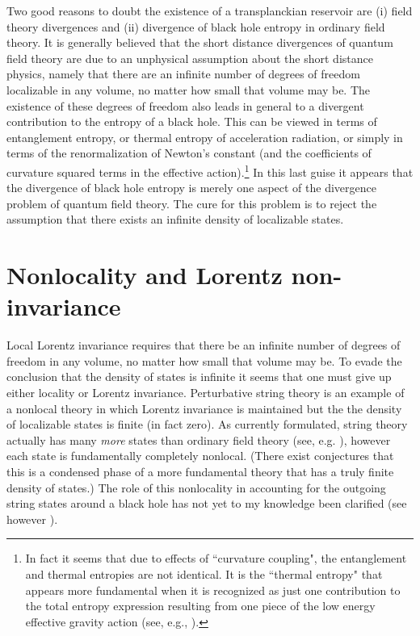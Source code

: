 Two good reasons to doubt the existence of a transplanckian reservoir
are (i) field theory divergences and (ii) divergence of black hole
entropy in ordinary field theory.  It is generally believed that the
short distance divergences of quantum field theory are due to an
unphysical assumption about the short distance physics, namely that
there are  an infinite number of degrees of freedom localizable in any
volume, no matter how small that volume may be.  The existence of these
degrees of freedom also leads in general to a divergent contribution to
the entropy of a black hole. This can be viewed in terms of
entanglement entropy\cite{Sork,Bombetal,FrolNovi}, or thermal entropy
of acceleration radiation\cite{tHooft}, or simply in terms of the
renormalization of Newton's constant (and the coefficients of curvature
squared terms in the effective
action)\cite{SussUglu,Jacoindu}.\footnote{In fact it seems that due to
effects of ``curvature coupling", the entanglement and thermal
entropies are not identical. It is the ``thermal entropy" that appears
more fundamental when it is recognized as just one contribution to the
total entropy expression resulting from one piece of the low energy
effective gravity action (see, e.g., \cite{Frol-rev}).} In this last
guise it appears that the divergence of black hole entropy is merely
one aspect of the divergence problem of quantum field theory.  The cure
for this problem is to reject the assumption that there exists an
infinite density of localizable states.


\section{Nonlocality and Lorentz non-invariance}

Local Lorentz invariance requires that there be an infinite number of
degrees of freedom in any volume, no matter how small that volume may
be. To evade the conclusion that the density of states is infinite it
seems that one must give up either locality or Lorentz invariance.
Perturbative string theory is an example of a nonlocal theory in which
Lorentz invariance is maintained but the the density of localizable
states is finite (in fact zero)\cite{Suss-lor}.  As currently
formulated, string theory actually has many {\it more} states than
ordinary field theory (see, e.g. \cite{Pol-rev}), however each state is
fundamentally completely nonlocal. (There exist conjectures that this
is a condensed phase of a more fundamental theory that has a truly
finite density of states\cite{AticWitt}.) The role of this nonlocality
in accounting for the outgoing string states around a black hole has
not yet to my knowledge been clarified (see however
\cite{Suss-prl,Suss-lor,Engletal}).

